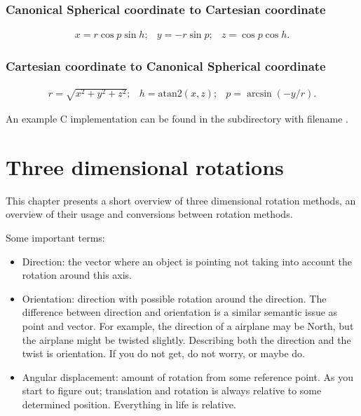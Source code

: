 \documentclass[a4paper,11pt]{article}
\begin{document}
\subsubsection{Canonical Spherical coordinate to Cartesian coordinate}

$$
\begin{array}{lcr}
x=r\cos p \sin h; & y=-r\sin p; & z=\cos p \cos h.
\end{array}
$$

\subsubsection{Cartesian coordinate to Canonical Spherical coordinate}

$$
\begin{array}{lcr}
r=\sqrt{x^2+y^2+z^2}; & h=\text{atan2}(x,z); & p=\arcsin(-y/r).
\end{array}
$$

An example C implementation can be found in the  subdirectory with filename .


\newpage
\section{Three dimensional rotations}

This chapter presents a short overview of three dimensional rotation methods, an overview of their usage and conversions between rotation methods.

Some important terms:

\begin{itemize}
	\item Direction: the vector where an object is pointing not taking into account the rotation around this axis.
	\item Orientation: direction with possible rotation around the direction. The difference between direction and orientation is a similar semantic issue as point and vector. For example, the direction of a airplane may be North, but the airplane might be twisted slightly. Describing both the direction and the twist is orientation. If you do not get, do not worry, or maybe do.
	\item Angular displacement: amount of rotation from some reference point. As you start to figure out; translation and rotation is always relative to some determined position. Everything in life is relative.
\end{itemize}
\end{document}
